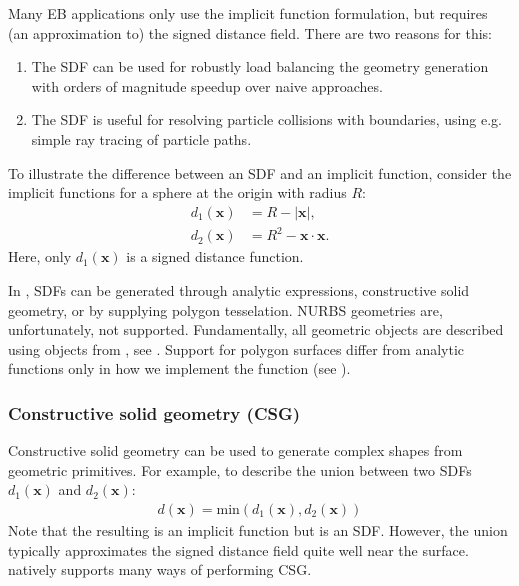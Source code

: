 \documentclass[letterpaper,10pt,english]{sphinxmanual}
\begin{document}
Many EB applications only use the implicit function formulation, but  requires (an approximation to) the signed distance field.
There are two reasons for this:
\begin{enumerate}
%
\item {} 
The SDF can be used for robustly load balancing the geometry generation with orders of magnitude speedup over naive approaches.

\item {} 
The SDF is useful for resolving particle collisions with boundaries, using e.g. simple ray tracing of particle paths.

\end{enumerate}

To illustrate the difference between an SDF and an implicit function, consider the implicit functions for a sphere at the origin with radius \(R\):
\begin{align}
d_1\left(\mathbf{x}\right) &= R - \left|\mathbf{x}\right|, \\
d_2\left(\mathbf{x}\right) &= R^2 - \mathbf{x}\cdot\mathbf{x}.
\end{align}
Here, only \(d_1\left(\mathbf{x}\right)\) is a signed distance function.

In , SDFs can be generated through analytic expressions, constructive solid geometry, or by supplying polygon tesselation.
NURBS geometries are, unfortunately, not supported.
Fundamentally, all geometric objects are described using  objects from , see {\hyperref[\detokenize{Source/ChomboBasics:chap-baseif}]{}}.
Support for polygon surfaces differ from analytic functions only in how we implement the  function (see {\hyperref[\detokenize{Source/ChomboBasics:chap-baseif}]{}}).


\subsubsection{Constructive solid geometry (CSG)}
\label{\detokenize{Source/SpatialDiscretization:constructive-solid-geometry-csg}}
Constructive solid geometry can be used to generate complex shapes from geometric primitives.
For example, to describe the union between two SDFs \(d_1\left(\mathbf{x}\right)\) and \(d_2\left(\mathbf{x}\right)\):
\begin{equation*}
\begin{split}d\left(\mathbf{x}\right) = \textrm{min}\left(d_1\left(\mathbf{x}\right), d_2\left(\mathbf{x}\right)\right)\end{split}
\end{equation*}
Note that the resulting is an implicit function but is  an SDF.
However, the union typically approximates the signed distance field quite well near the surface.
 natively supports many ways of performing CSG.
\end{document}
